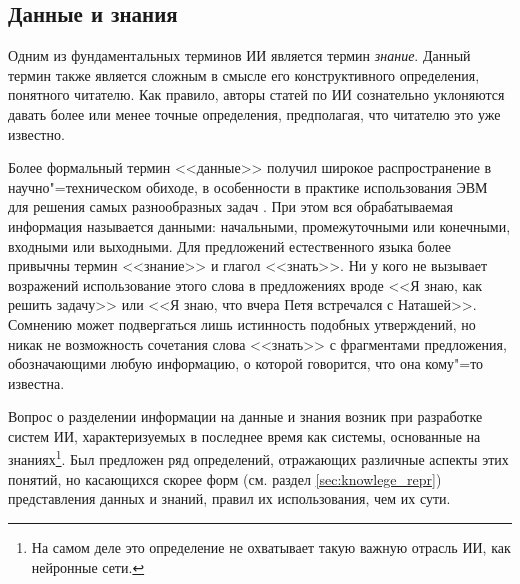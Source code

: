 \documentclass[a4paper,14pt, openany, twoside, final]{extbook} %
\begin{document}
\subsection{Данные и знания}

Одним из фундаментальных терминов ИИ является термин {\em знание}. Данный термин также является сложным в смысле его конструктивного определения, понятного читателю. Как правило, авторы статей по ИИ сознательно уклоняются давать более или менее точные определения, предполагая, что читателю это уже известно.

Более формальный термин <<данные>> получил широкое распространение в научно"=техническом обиходе, в особенности в практике использования ЭВМ для решения самых разнообразных задач \cite{AIDictionary}. При этом вся обрабатываемая информация называется данными: начальными, промежуточными или конечными, входными или выходными. Для предложений естественного языка более привычны термин <<знание>> и глагол <<знать>>. Ни у кого не вызывает возражений использование этого слова в предложениях вроде <<Я знаю, как решить задачу>> или <<Я знаю, что вчера Петя встречался с Наташей>>. Сомнению может подвергаться лишь истинность подобных утверждений, но никак не возможность сочетания слова <<знать>> с фрагментами предложения, обозначающими любую информацию, о которой говорится, что она кому"=то известна.

Вопрос о разделении информации на данные и знания возник при разработке систем ИИ, характеризуемых в последнее время как системы, основанные на знаниях\footnote{На самом деле это определение не охватывает такую важную отрасль ИИ, как нейронные сети.}. Был предложен ряд определений, отражающих различные аспекты этих понятий, но касающихся скорее форм (см. раздел \ref{sec:knowlege_repr}) представления данных и знаний, правил их использования, чем их сути.
\end{document}
